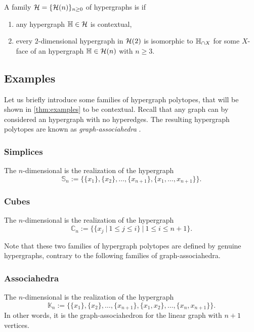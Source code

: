 \begin{definition}
    A family $\mathcal{H}=\{\mathcal{H}(n)\}_{n\geq 0}$ of hypergraphs is  if 
    \begin{enumerate}
      \item any hypergraph ${\mathbb H} \in \mathcal{H}$ is contextual,
      \item every $2$-dimensional hypergraph in $\mathcal{H}(2)$ is isomorphic to ${\mathbb H}_{\cap X}$ for some $X$-face of an hypergraph ${\mathbb H} \in \mathcal{H}(n)$ with $n\geq 3$. 
    \end{enumerate}
\end{definition}


\subsection{Examples}
\label{ss:examples}

Let us briefly introduce some families of hypergraph polytopes, that will be shown in \cref{thm:examples} to be contextual. 
Recall that any graph can by considered an hypergraph with no hyperedges.
The resulting hypergraph polytopes are known as \emph{graph-associahedra} \cite{CD-CCGA}.

\subsubsection{Simplices}
The $n$-dimensional  is the realization of the hypergraph 
$$\mathbb{S}_n:=\{\{x_1\},\{x_2\},\ldots,\{x_{n+1}\},\{x_1,\ldots,x_{n+1}\}\}.$$

\subsubsection{Cubes}
The $n$-dimensional  is the realization of the hypergraph
$$\mathbb{C}_n:=\{\{x_j \ | \ 1 \leq j \leq i \} \ | \ 1 \leq i \leq n+1\}.$$

\begin{rem}
  Note that these two families of hypergraph polytopes are defined by genuine hypergraphs, contrary to the following families of graph-associahedra.
\end{rem}

\subsubsection{Associahedra}
The $n$-dimensional  is the realization of the hypergraph 
$$\mathbb{K}_n:=\{\{x_1\},\{x_2\},\ldots,\{x_{n+1}\},\{x_1,x_2\},\ldots,\{x_n,x_{n+1}\}\}.$$
In other words, it is the graph-associahedron for the linear graph with $n+1$ vertices.

